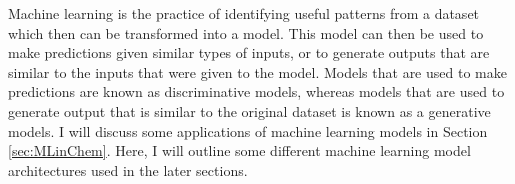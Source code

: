 Machine learning is the practice of identifying useful patterns from a dataset which then can be transformed into a model. 
This model can then be used to make predictions given similar types of inputs, or to generate outputs that are similar to the inputs that were given to the model. 
Models that are used to make predictions are known as discriminative models, whereas models that are used to generate output that is similar to the original dataset is known as a generative models.
I will discuss some applications of machine learning models in Section \ref{sec:MLinChem}. Here, I will outline some different machine learning model architectures used in the later sections.
